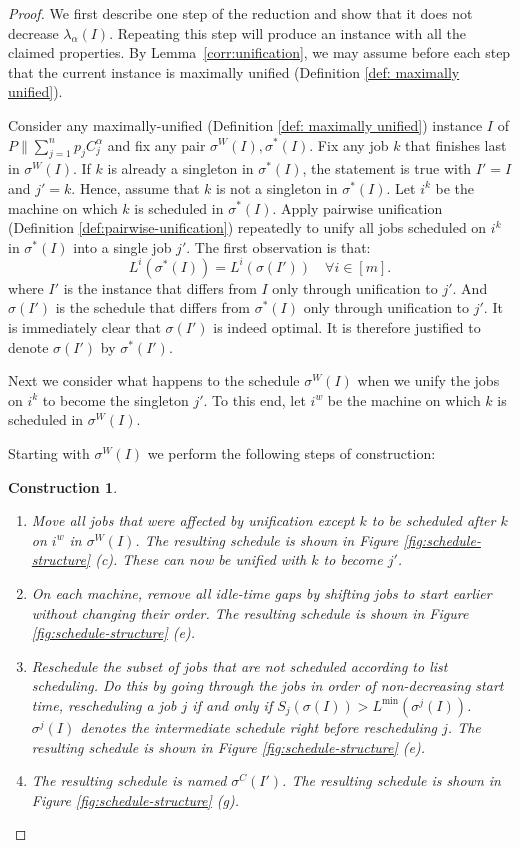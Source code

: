 \documentclass[%
english, titlepage=false %
]{./tum-templates/book/tumbook}
\newtheorem{construction}{Construction}
\begin{document}
\begin{proof}
We first describe one step of the reduction and show that it does not decrease
$\lambda_{\alpha}(I)$. Repeating this step will produce an instance with all
the claimed properties. By Lemma~\ref{corr:unification}, we may assume before
each step that the current instance is maximally unified
(Definition \ref{def: maximally unified}).\medskip

Consider any maximally-unified (Definition \ref{def: maximally unified}) instance $I$ of $P\!\parallel\!\sum_{j=1}^{n}p_j C_j^{\alpha}$ and fix any pair $\sigma^{W}(I),\sigma^{*}(I)$. Fix any job $k$ that finishes last in $\sigma^{W}(I)$.
If $k$ is already a singleton in $\sigma^*(I)$, the statement is true
with $I'=I$ and $j'=k$. Hence, assume that $k$ is not a singleton in
$\sigma^*(I)$.
Let $i^k$ be the machine on which $k$ is scheduled in $\sigma^{*}(I)$.
Apply pairwise unification (Definition \ref{def:pairwise-unification}) repeatedly to unify all jobs scheduled on $i^k$ in $\sigma^{*}(I)$ into a single job $j'$.
The first observation is that:
\[
L^{i}(\sigma^{*}(I)) = L^{i}(\sigma(I')) \quad \forall i \in [m].
\]
where $I'$ is the instance that differs from $I$ only through unification to $j'$.
And $\sigma(I')$ is the schedule that differs from $\sigma^{*}(I)$ only through unification to $j'$.
It is immediately clear that $\sigma(I')$ is indeed optimal.
It is therefore justified to denote $\sigma(I')$ by $\sigma^*(I')$. \medskip

\noindent
Next we consider what happens to the schedule $\sigma^{W}(I)$ when we unify the jobs on $i^k$ to become the singleton $j'$.
To this end, let $i^{w}$ be the machine on which $k$ is scheduled in $\sigma^{W}(I)$.

Starting with $\sigma^{W}(I)$ we perform the following steps of construction:
\begin{construction}\label{building SW}
\leavevmode
\begin{enumerate}
    \item Move all jobs that were affected by unification except $k$ to be scheduled after $k$ on $i^{w}$ in $\sigma^{W}(I)$. The resulting schedule is shown in Figure \ref{fig:schedule-structure} (c).
     These can now be unified with $k$ to become $j'$.
    \item On each machine, remove all idle-time gaps by shifting jobs to start earlier without changing their order. The resulting schedule is shown in Figure \ref{fig:schedule-structure} (e).
    \item Reschedule the subset of jobs that are not scheduled according to list scheduling. Do this by going through the jobs in order of
     non-decreasing start time, rescheduling a job $j$ if and only if $S_j(\sigma(I))>L^{\min}(\sigma^{j}(I))$. $\sigma^{j}(I)$ denotes the intermediate schedule 
     right before rescheduling $j$. The resulting schedule is shown in Figure \ref{fig:schedule-structure} (e).
    \item The resulting schedule is named $\sigma^{C}(I')$. The resulting schedule is shown in Figure \ref{fig:schedule-structure} (g).
\end{enumerate}
\end{construction}



\end{proof}
\end{document}
